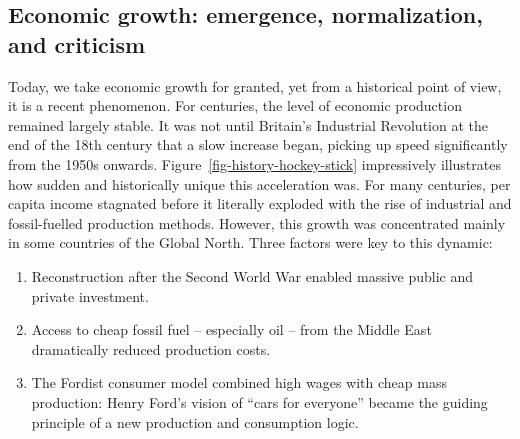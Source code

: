 \documentclass[
  a4paper,
  openany]{book}
\providecommand{\tightlist}{%
  \setlength{\itemsep}{0pt}\setlength{\parskip}{0pt}}
\begin{document}
\subsection{Economic growth: emergence, normalization, and
criticism}\label{economic-growth-emergence-normalization-and-criticism}

Today, we take economic growth for granted, yet from a historical point
of view, it is a recent phenomenon. For centuries, the level of economic
production remained largely stable. It was not until Britain's
Industrial Revolution at the end of the 18th century that a slow
increase began, picking up speed significantly from the 1950s onwards.
Figure~\ref{fig-history-hockey-stick} impressively illustrates how
sudden and historically unique this acceleration was. For many
centuries, per capita income stagnated before it literally exploded with
the rise of industrial and fossil-fuelled production methods. However,
this growth was concentrated mainly in some countries of the Global
North. Three factors were key to this dynamic:

\begin{enumerate}
\def\labelenumi{\arabic{enumi}.}
\tightlist
\item
  Reconstruction after the Second World War enabled massive public and
  private investment.
\item
  Access to cheap fossil fuel -- especially oil -- from the Middle East
  dramatically reduced production costs.
\item
  The Fordist consumer model combined high wages with cheap mass
  production: Henry Ford's vision of ``cars for everyone'' became the
  guiding principle of a new production and consumption logic.
\end{enumerate}
\end{document}
